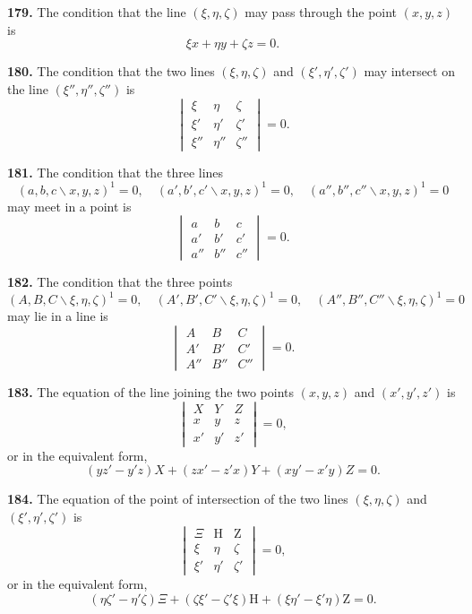 \documentclass[11pt,a4paper]{article}
\begin{document}
\textbf{179.} The condition that the line $(\xi,\eta,\zeta)$ may pass through the point $(x,y,z)$ is
\[
\xi x + \eta y + \zeta z = 0.
\]

\textbf{180.} The condition that the two lines $(\xi,\eta,\zeta)$ and $(\xi',\eta',\zeta')$ may intersect
on the line $(\xi'',\eta'',\zeta'')$ is
\[
\begin{vmatrix}
\xi & \eta & \zeta \\
\xi' & \eta' & \zeta' \\
\xi'' & \eta'' & \zeta''
\end{vmatrix} = 0.
\]

\textbf{181.} The condition that the three lines
\[
(a,b,c\!\backslash x,y,z)^1=0,\quad (a',b',c'\!\backslash x,y,z)^1=0,\quad (a'',b'',c''\!\backslash x,y,z)^1=0
\]
may meet in a point is
\[
\begin{vmatrix}
a & b & c \\
a' & b' & c' \\
a'' & b'' & c''
\end{vmatrix} = 0.
\]

\textbf{182.} The condition that the three points
\[
(A,B,C\!\backslash \xi,\eta,\zeta)^1=0,\quad (A',B',C'\!\backslash \xi,\eta,\zeta)^1=0,\quad (A'',B'',C''\!\backslash \xi,\eta,\zeta)^1=0
\]
may lie in a line is
\[
\begin{vmatrix}
A & B & C \\
A' & B' & C' \\
A'' & B'' & C''
\end{vmatrix} = 0.
\]

\textbf{183.} The equation of the line joining the two points $(x,y,z)$ and $(x',y',z')$ is
\[
\begin{vmatrix}
X & Y & Z \\
x & y & z \\
x' & y' & z'
\end{vmatrix} = 0,
\]
or in the equivalent form,
\[
(yz'-y'z)X + (zx'-z'x)Y + (xy'-x'y)Z = 0.
\]

\textbf{184.} The equation of the point of intersection of the two lines
$(\xi,\eta,\zeta)$ and $(\xi',\eta',\zeta')$ is
\[
\begin{vmatrix}
\Xi & \mathrm{H} & \mathrm{Z} \\
\xi & \eta & \zeta \\
\xi' & \eta' & \zeta'
\end{vmatrix} = 0,
\]
or in the equivalent form,
\[
(\eta\zeta'-\eta'\zeta)\Xi + (\zeta\xi'-\zeta'\xi)\mathrm{H} + (\xi\eta'-\xi'\eta)\mathrm{Z} = 0.
\]
\end{document}
